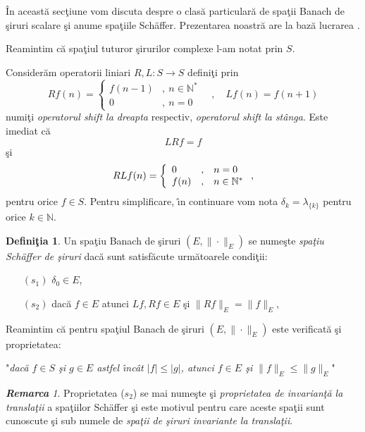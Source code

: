 \documentclass[ a4paper, 12pt]{report}
\newcommand{\N}{\mathbb{N}}
\theoremstyle{definition}
\newtheorem{definition}{\bf Defini\c tia}[section]
\theoremstyle{remark}
\newtheorem{remarc}{\bf Remarca}[section]
\numberwithin{equation}{section}
\begin{document}
\vspace{1cm}

\^ In aceast\u a sec\c tiune vom discuta despre o clas\u a particular\u a de spa\c tii Banach de \c siruri scalare \c si anume spa\c tiile Sch\" affer. Prezentarea noastr\u a are la baz\u a lucrarea \cite{coffmanschaffer67}.

 Reamintim c\u a spa\c tiul tuturor \c sirurilor complexe l-am notat prin $S$.

Consider\u am operatorii liniari
$R,L: S \to S$ defini\c ti prin
$$ Rf(n)=\begin{cases} f(n-1) &,\ n\in\N^*\\ 0 &,\ n=0 \end{cases}\quad,\quad Lf(n)=f(n+1)$$
numi\c ti \textit{operatorul shift la dreapta} respectiv, \textit{operatorul shift la st\^ anga}. Este imediat c\u a
$$LRf=f$$ \c si
$$RLf(n)= \left\{ \begin{array}{lcl} 0&,& n = 0 \cr f(n) &,& n\in\N^*\end{array}\right.,$$ pentru orice $f\in S$.
Pentru simplificare, \^\i n continuare vom nota $\delta_k=\lambda_{\{k\}}$ pentru orice $k\in\N$.

\begin{definition}
Un spa\c tiu Banach de \c siruri $(E,\|\cdot\|_{E})$ se nume\c ste {\it spa\c tiu Sch\"{a}ffer de \c siruri} dac\u a sunt satisf\u acute urm\u atoarele condi\c tii:
\begin{enumerate}
\item[$(s_1)$] $\delta_0\in E$,
\item[$(s_2)$] dac\u a  $f\in E$ atunci $Lf, Rf\in E$ \c si $\|Rf\|_{E}=\|f\|_{E}$,
\end{enumerate}
\end{definition}

Reamintim c\u a pentru spa\c tiul Banach de \c siruri $(E,\|\cdot\|_{E})$ este verificat\u a \c si proprietatea:

\smallskip

"\emph{dac\u a $f\in S$ \c si  $g\in E$ astfel \^\i nc\^ at $|f|\leq|g|$, atunci $f\in E$ \c si $\|f\|_{E}\leq \|g\|_{E}$}"

\smallskip

\begin{remarc}
Proprietatea ($s_2$) se mai nume\c ste \c si \emph{proprietatea de invarian\c t\u a la transla\c tii} a spa\c tiilor Sch\" affer \c si este motivul pentru care aceste spa\c tii sunt cunoscute \c si sub numele de \emph{spa\c tii de \c siruri invariante la transla\c tii}.
\end{remarc}
\end{document}
